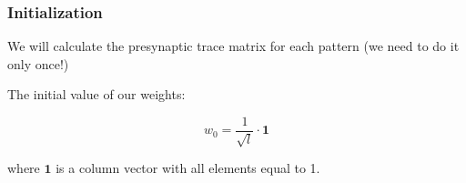 \subsubsection{Initialization} \label{subsubsec:STDP-init}

We will calculate the presynaptic trace matrix for each pattern (we need to do it only once!)

The initial value of our weights:

\begin{equation}
    w_0 = \frac{1}{\sqrt{l}} \cdot \mathbf{1}
\end{equation}

where $\mathbf{1}$ is a column vector with all elements equal to 1.
